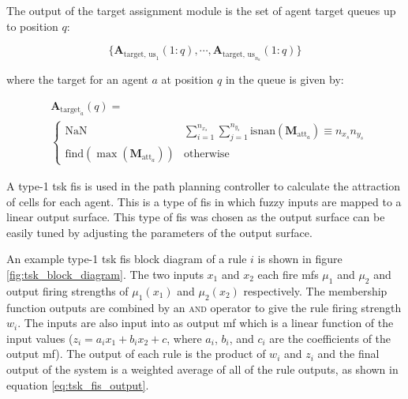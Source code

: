 \documentclass[conference]{IEEEtran}
\begin{document}
The output of the target assignment module is the set of agent target queues up to position $q$:

\begin{equation} \label{eq:calc_S_A_target_us}
    \{ \bm{A}_{\text{target, us}_{1}}(1:q), \cdots, \bm{A}_{\text{target, us}_{n_{a}}}(1:q) \}
\end{equation}

where the target for an agent $a$ at position $q$ in the queue is given by:

\begin{equation} \label{eq:calc_A_target_us}
    \begin{split}
        & \bm{A}_{\text{target}_{a}}(q) =\\
        &\begin{cases}
            \text{NaN} & \sum_{i=1}^{n_{x_{s}}} \sum_{j=1}^{n_{y_{s}}} \text{isnan}(\bm{M}_{\text{att}_{a}}) \equiv n_{x_{s}} n_{y_{s}} \\
            \text{find}(\max(\bm{M}_{\text{att}_{a}})) & \text{otherwise}
        \end{cases}
    \end{split}
\end{equation}


A type-1 \gls{tsk} \gls{fis} is used in the path planning controller to calculate the attraction of cells for each agent.
This is a type of \gls{fis} in which fuzzy inputs are mapped to a linear output surface.
This type of \gls{fis} was chosen as the output surface can be easily tuned by adjusting the parameters of the output surface.

An example type-1 \gls{tsk} \gls{fis} block diagram of a rule $i$ is shown in figure \ref{fig:tsk_block_diagram}.
The two inputs $x_{1}$ and $x_{2}$ each fire \gls{mf}s $\mu_{1}$ and $\mu_{2 }$ and output firing strengths of $\mu_{1}(x_{1})$ and $\mu_{2}(x_{2})$ respectively.
The membership function outputs are combined by an \textsc{and} operator to give the rule firing strength $w_{i}$.
The inputs are also input into as output \gls{mf} which is a linear function of the input values  ($z_{i} = a_{i} x_{1} + b_{i} x_{2} + c$, where $a_{i}$, $b_{i}$, and $c_{i}$ are the coefficients of the output \gls{mf}).
The output of each rule is the product of $w_{i}$ and $z_{i}$ and the final output of the system is a weighted average of all of the rule outputs, as shown in equation \ref{eq:tsk_fis_output}.
\end{document}

